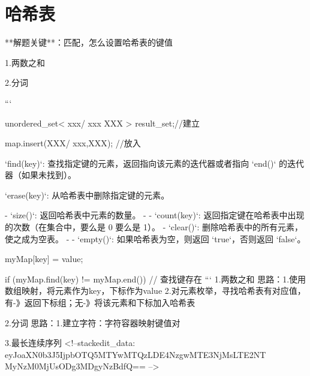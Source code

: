 \chapter{哈希表}

**解题关键**：匹配，怎么设置哈希表的键值


1.两数之和

2.分词

```

unordered_set< xxx/ xxx XXX > result_set;//建立

map.insert(XXX/ {xxx,XXX}); //放入

`find(key)`: 查找指定键的元素，返回指向该元素的迭代器或者指向 `end()` 的迭代器（如果未找到）。

`erase(key)`: 从哈希表中删除指定键的元素。

-   `size()`: 返回哈希表中元素的数量。
- -   `count(key)`: 返回指定键在哈希表中出现的次数（在集合中，要么是 0 要么是 1）。
-   `clear()`: 删除哈希表中的所有元素，使之成为空表。
- -   `empty()`: 如果哈希表为空，则返回 `true`，否则返回 `false`。

myMap[key] = value;

if (myMap.find(key) != myMap.end()) {
    // 查找键存在
}
```
1.两数之和
思路：1.使用数组映射，将元素作为key，下标作为value
2.对元素枚举，寻找哈希表有对应值，有-》返回下标组；无-》将该元素和下标加入哈希表

2.分词
思路：1.建立字符：字符容器映射键值对

3.最长连续序列
<!--stackedit_data:
eyJoaXN0b3J5IjpbOTQ5MTYwMTQzLDE4NzgwMTE3NjMsLTE2NT
MyNzM0MjUsODg3MDgyNzBdfQ==
-->